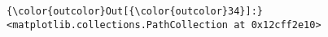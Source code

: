 \documentclass[11pt]{article}
\begin{document}
\begin{Verbatim}[commandchars=\\\{\}]
{\color{outcolor}Out[{\color{outcolor}34}]:} <matplotlib.collections.PathCollection at 0x12cff2e10>
\end{Verbatim}
            
    \begin{center}
    \end{center}
    { \hspace*{\fill} \\}
    

    
    
    
    
\end{document}
